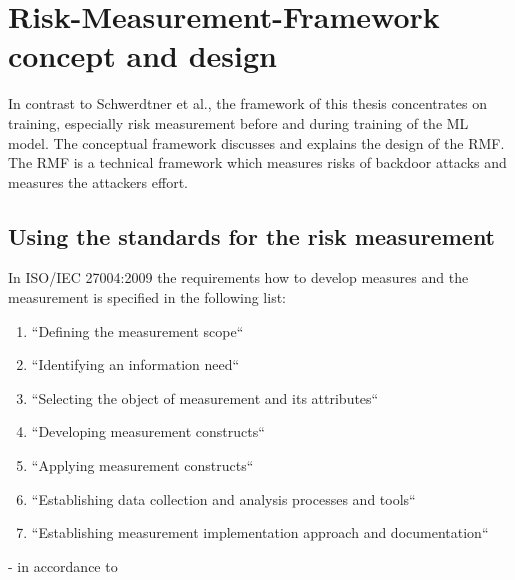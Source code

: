 \section{Risk-Measurement-Framework concept and design}
\label{sec:conFrame}

In contrast to Schwerdtner et al., the framework of this thesis concentrates on training, especially risk measurement before and during training of the ML model. The conceptual framework discusses and explains the design of the RMF. The RMF is a technical framework which measures risks of backdoor attacks and measures the attackers effort.

\subsection{Using the standards for the risk measurement}

In ISO/IEC 27004:2009 the requirements how to develop measures and the measurement is specified in the following list:

\begin{enumerate}[label=(\alph*)]
  \item \label{itm:a} ``Defining the measurement scope``
  \item \label{itm:b} ``Identifying an information need``
  \item \label{itm:c} ``Selecting the object of measurement and its attributes``
  \item \label{itm:d} ``Developing measurement constructs``
  \item \label{itm:e} ``Applying measurement constructs``
  \item \label{itm:f} ``Establishing data collection and analysis processes and tools``
  \item \label{itm:g} ``Establishing measurement implementation approach and documentation``
\end{enumerate}

\hfill - in accordance to \cite{ISO_27004_2009} \\


